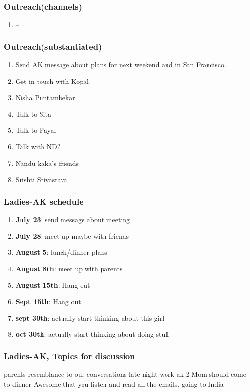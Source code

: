 \begin{frame} 
\frametitle{Outreach(channels)}
\begin{enumerate} 

\item \small --

\end{enumerate} 
\end{frame} 


\begin{frame} 
\frametitle{Outreach(substantiated)}
\begin{enumerate} 
\item Send AK message about plans for next weekend and in San Francisco. 
\item Get in touch with Kopal 
\item Nisha Puntambekar
\item Talk to Sita 
\item Talk to Payal
\item Talk with ND?
\item Nandu kaka's friends
\item Srishti Srivastava 
\end{enumerate} 
\end{frame} 



\begin{frame} 
\frametitle{Ladies-AK schedule}
\begin{enumerate} 
\item \textbf{July 23}: send message about meeting
\item \textbf{July 28}: meet up maybe with friends
\item \textbf{August 5}: lunch/dinner plans
\item \textbf{August 8th}:  meet up with parents 
\item \textbf{August 15th}: Hang out 
\item \textbf{Sept 15th}: Hang out 
\item \textbf{sept 30th}: actually start thinking about this girl
\item \textbf{oct 30th}: actually start thinking about doing stuff
\end{enumerate} 
\end{frame} 

\begin{frame} 
\frametitle{Ladies-AK, Topics for discussion}
\begin{itemize} 
\bllt parents resemblance to our conversations
\bllt late night work 
\bllt ak 2 
\bllt Mom should come to dinner
\bllt Awesome that you listen and read all the emails. 
\bllt going to India 
\end{itemize} 
\end{frame}




